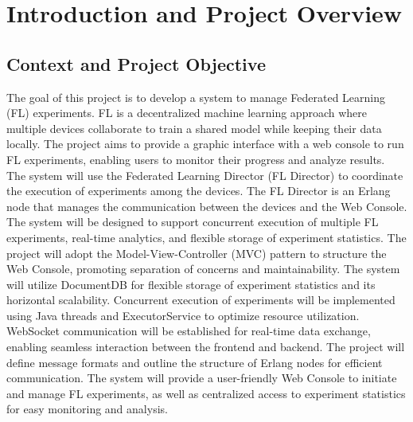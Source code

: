 \chapter{Introduction and Project Overview}

\section{Context and Project Objective}

The goal of this project is to develop a system to manage Federated Learning (FL) experiments. FL is a decentralized machine learning approach where multiple devices collaborate to train a shared model while keeping their data locally. The project aims to provide a graphic interface with a web console to run FL experiments, enabling users to monitor their progress and analyze results. The system will use the Federated Learning Director (FL Director) to coordinate the execution of experiments among the devices. The FL Director is an Erlang node that manages the communication between the devices and the Web Console. The system will be designed to support concurrent execution of multiple FL experiments, real-time analytics, and flexible storage of experiment statistics. The project will adopt the Model-View-Controller (MVC) pattern to structure the Web Console, promoting separation of concerns and maintainability. The system will utilize DocumentDB for flexible storage of experiment statistics and its horizontal scalability. Concurrent execution of experiments will be implemented using Java threads and ExecutorService to optimize resource utilization. WebSocket communication will be established for real-time data exchange, enabling seamless interaction between the frontend and backend. The project will define message formats and outline the structure of Erlang nodes for efficient communication. The system will provide a user-friendly Web Console to initiate and manage FL experiments, as well as centralized access to experiment statistics for easy monitoring and analysis.

